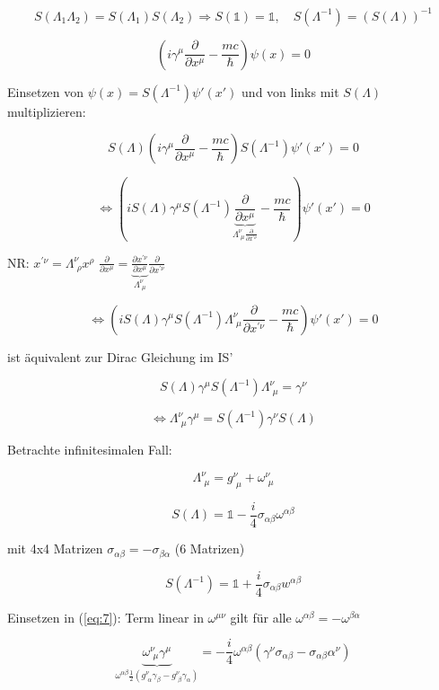 \[\boxed{S(\Lambda_1\Lambda_2) = S(\Lambda_1)S(\Lambda_2) \Rightarrow S(\mathbb 1) = \mathbb 1, \quad S(\Lambda^{-1})=(S(\Lambda))^{-1}}\]


\[ (i\gamma^\mu\frac{\partial}{\partial x^\mu}-\frac{mc}{\hbar})\psi(x) = 0\]

Einsetzen von \(\psi(x) = S(\Lambda^{-1})\psi'(x')\) und von links mit \(S(\Lambda)\) multiplizieren:

\[S(\Lambda)  (i\gamma^\mu\frac{\partial}{\partial x^\mu}-\frac{mc}{\hbar})S(\Lambda^{-1}) \psi'(x') = 0\]

\[\Leftrightarrow \left(iS(\Lambda) \gamma^\mu S(\Lambda^{-1})\underbrace{\frac{\partial}{\partial x^\mu}}_{\Lambda^\nu_{\,\,\mu}\frac{\partial}{\partial x^{'\nu}}} - \frac{mc}{\hbar}\right)\psi'(x') = 0 \]

NR: \(x^{'\nu}=\Lambda^\nu_{\,\,\rho}x^\rho \) \(\frac{\partial}{\partial x^\mu} =\underbrace{\frac{\partial x^{'\nu}}{\partial x^{\mu}}}_{\Lambda^\nu_{\,\,\mu}}\frac{\partial}{\partial x^{'\nu}} \)



\[\Leftrightarrow \left(iS(\Lambda) \gamma^\mu S(\Lambda^{-1})\Lambda^\nu_{\,\,\mu}\frac{\partial}{\partial x^{'\nu}} - \frac{mc}{\hbar}\right)\psi'(x') = 0 \]



ist äquivalent zur Dirac Gleichung im IS'

\[S(\Lambda)\gamma^\mu S(\Lambda^{-1})\Lambda^\nu_{\,\,\mu} = \gamma^\nu\]

\begin{equation}
  \label{eq:7}
\Leftrightarrow \boxed{ \Lambda^\nu_{\,\,\mu}\gamma^\mu = S(\Lambda^{-1})\gamma^\nu S(\Lambda)  }   
\end{equation}



Betrachte infinitesimalen Fall:

\[ \Lambda^\nu_{\,\,\mu} = g^\nu_{\,\,\mu}+\omega^\nu_{\,\,\mu}  \]

\[S(\Lambda) = \mathbb 1 - \frac{i}{4} \sigma_{\alpha\beta}\omega^{\alpha\beta}\]

mit 4x4 Matrizen \(\sigma_{\alpha\beta} = - \sigma_{\beta\alpha} \) (6 Matrizen)

\[ S(\Lambda^{-1}) = \mathbb 1 + \frac{i}{4} \sigma_{\alpha\beta}w^{\alpha\beta}  \]

Einsetzen in (\ref{eq:7}): Term linear in \( \omega^{\mu\nu}  \) gilt für alle \(\omega^{\alpha\beta} = -\omega^{\beta\alpha}\)

\[\underbrace{\omega^\nu_{\,\,\mu}\gamma^{\mu}}_{\omega^{\alpha\beta}\frac{1}{2}(g^{\nu}_{\,\,\alpha}\gamma_\beta -g^{\nu}_{\,\,\beta}\gamma_\alpha) } = -  \frac{i}{4}\omega^{\alpha\beta}(\gamma^\nu\sigma_{\alpha\beta}-\sigma_{\alpha\beta}\alpha^\nu) \]


